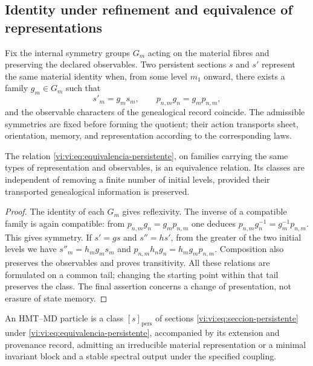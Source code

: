 \subsection{Identity under refinement and equivalence of representations}
\label{vi:vi:subsec:identidad-material}

Fix the internal symmetry groups $G_m$ acting on the material
fibres and preserving the declared observables. Two persistent
sections $s$ and $s'$ represent the same material identity when,
from some level $m_1$ onward, there exists a family $g_m\in G_m$ such that
\begin{equation}
 s'_m=g_ms_m,\qquad
 p_{n,m}g_n=g_mp_{n,m},
 \label{vi:vi:eq:equivalencia-persistente}
\end{equation}
and the observable characters of the genealogical record coincide. The
admissible symmetries are fixed before forming the quotient; their action
transports sheet, orientation, memory, and representation according to
the corresponding laws.

\begin{proposition}
\label{vi:vi:prop:equivalencia-persistente}
The relation \eqref{vi:vi:eq:equivalencia-persistente}, on families carrying
the same types of representation and observables, is an equivalence
relation. Its classes are independent of removing a finite
number of initial levels, provided their transported genealogical
information is preserved.
\end{proposition}
\begin{proof}
The identity of each $G_m$ gives reflexivity. The inverse of a compatible
family is again compatible: from
$p_{n,m}g_n=g_mp_{n,m}$ one deduces
$p_{n,m}g_n^{-1}=g_m^{-1}p_{n,m}$. This gives symmetry.
If $s'=gs$ and $s''=hs'$, from the greater of the two initial levels
we have $s''_m=h_mg_ms_m$ and
$p_{n,m}h_ng_n=h_mg_mp_{n,m}$. Composition also preserves the
observables and proves transitivity. All these relations are formulated
on a common tail; changing the starting point within that tail
preserves the class. The final assertion concerns a change of
presentation, not erasure of state memory.
\end{proof}

\begin{definition}
\label{vi:vi:def:particula}
An HMT--MD particle is a class $[s]_{\mathrm{pers}}$ of sections
\eqref{vi:vi:eq:seccion-persistente} under
\eqref{vi:vi:eq:equivalencia-persistente}, accompanied by its extension and
provenance record, admitting an irreducible material
representation or a minimal invariant block and a stable spectral output
under the specified coupling.
\end{definition}

